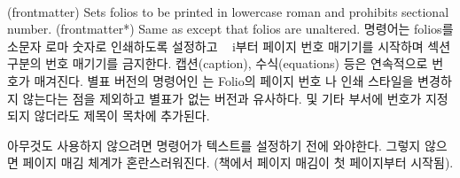 \begin{syntax}
\cmd{\frontmatter} \cmd{\frontmatter*} \\
\end{syntax}
\glossary(frontmatter)%
  {}%
  {Sets folios to be printed in lowercase roman and prohibits sectional
   number.}
\glossary(frontmatter*)%
  {}%
  {Same as  except that folios are unaltered.}
\cmd{\frontmatter} 명령어는 folios를 소문자 로마 숫자로 인쇄하도록 설정하고 ~ i부터 페이지 번호 매기기를 시작하며 섹션 구분의 번호 매기기를 금지한다.
캡션(caption), 수식(equations) 등은 연속적으로 번호가 매겨진다. 별표 버전의 명령어인 \cmd{\frontmatter*}는 Folio의 페이지 번호 나 인쇄 스타일을 변경하지 않는다는 점을 제외하고 별표가 없는 버전과 유사하다.
\cmd{\chapter} 및 기타 부서에 번호가 지정되지 않더라도 제목이 목차에 추가된다.

아무것도 사용하지 않으려면 \cmd{\frontmatter} 명령어가 텍스트를 설정하기 전에 와야한다. 그렇지 않으면 페이지 매김 체계가 혼란스러워진다. (책에서 페이지 매김이 첫 페이지부터 시작됨).

